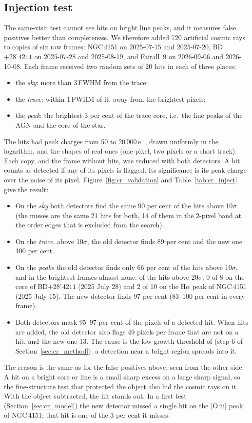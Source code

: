\subsection{Injection test}
\label{sec:cr_inject}
The same-visit test cannot see hits on bright line peaks, and it measures false positives better than completeness.
We therefore added 720 artificial cosmic rays to copies of six raw frames: NGC\,4151 on 2025-07-15 and 2025-07-20,
BD$+28^\circ4211$ on 2025-07-28 and 2025-08-19, and Fairall~9 on 2026-09-06 and 2026-10-08. Each frame received two
random sets of 20 hits in each of three places:
\begin{itemize}
\item the \textit{sky}: more than 3\,FWHM from the trace;
\item the \textit{trace}: within 1\,FWHM of it, away from the brightest pixels;
\item the \textit{peak}: the brightest 3 per cent of the trace core, i.e.\ the line peaks of the AGN and the core of
the star.
\end{itemize}
The hits had peak charges from 50 to 20\,000\,e$^-$, drawn uniformly in the logarithm, and the shapes of real ones
(one pixel, two pixels or a short track). Each copy, and the frame without hits, was reduced with both detectors. A hit
counts as detected if any of its pixels is flagged. Its significance is its peak charge over the noise of its pixel.
Figure~\ref{fig:cr_validation} and Table~\ref{tab:cr_inject} give the result:
\begin{itemize}
\item On the \textit{sky} both detectors find the same 90 per cent of the hits above 10$\sigma$ (the misses are the same
21 hits for both, 14 of them in the 2-pixel band at the order edges that is excluded from the search).
\item On the \textit{trace}, above 10$\sigma$, the old detector finds 89 per cent and the new one 100 per cent.
\item On the \textit{peaks} the old detector finds only 66 per cent of the hits above 10$\sigma$, and in the brightest
frames almost none: of the hits above 20$\sigma$, 0 of 8 on the core of BD$+28^\circ4211$ (2025 July 28) and 2 of 10 on
the H$\alpha$ peak of NGC\,4151 (2025 July 15). The new detector finds 97 per cent (83--100 per cent in every frame).
\item Both detectors mask 95--97 per cent of the pixels of a detected hit. When hits are added, the old detector also
flags 49 pixels per frame that are not on a hit, and the new one 13. The cause is the low growth threshold of
\banzai{} (step 6 of Section~\ref{sec:cr_method}): a detection near a bright region spreads into it.
\end{itemize}
The reason is the same as for the false positives above, seen from the other side. A hit on a bright core or line is
a small sharp excess on a large sharp signal, so the fine-structure test that protected the object also hid the cosmic
rays on it. With the object subtracted, the hit stands out. In a first test (Section~\ref{sec:cr_model}) the new
detector missed a single hit on the [O\,{\sc iii}] peak of NGC\,4151; that hit is one of the 3 per cent it misses.

